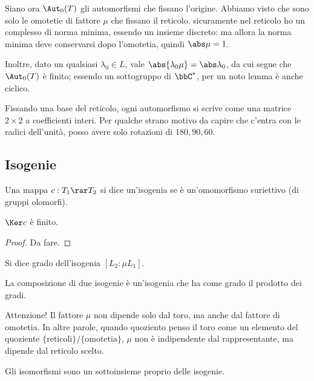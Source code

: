 	Siano ora $\Aut_0(T)$ gli automorfismi che fissano l'origine. Abbiamo visto che sono solo le omotetie di fattore $\mu$ che fissano il reticolo. sicuramente nel reticolo ho un complesso di norma minima, essendo un insieme discreto: ma allora la norma minima deve conservarsi dopo l'omotetia, quindi $\abs \mu=1$.
	
	Inoltre, dato un qualsiasi $\lambda_0 \in L$, vale $\abs{\lambda_0 \mu} = \abs \lambda_0$, da cui segue che $\Aut_0(T)$ è finito; essendo un sottogruppo di $\bbC^*$, per un noto lemma è anche ciclico.
	
	Fissando una base del reticolo, ogni automorfismo si scrive come una matrice $2 \times 2$ a coefficienti interi. Per qualche strano motivo da capire che c'entra con le radici dell'unità, %
	posso avere solo rotazioni di $180, 90, 60$.
	
	\subsection{Isogenie}
	
	\begin{definizione}
		Una mappa $c: T_1 \rar T_2$ si dice un'isogenia se è un'omomorfismo suriettivo (di gruppi olomorfi).

	\end{definizione}
	
	\begin{proposizione}
		$\Ker c$ è finito.
	\end{proposizione}
	\begin{proof}
		Da fare.
	\end{proof}
	
	\begin{definizione}
		Si dice grado dell'isogenia $[L_2 : \mu L_1]$.
	\end{definizione}
	
	\begin{osservazione}
		La composizione di due isogenie è un'isogenia che ha come grado il prodotto dei gradi.
	\end{osservazione}
	
	Attenzione! Il fattore $\mu$ non dipende solo dal toro, ma anche dal fattore di omotetia. In altre parole, quando quoziento penso il toro come un elemento del quoziente $\{ \mbox{reticoli} \} / \{ \mbox{omotetia} \}$, $\mu$ non è indipendente dal rappresentante, ma dipende dal reticolo scelto.
	
	\begin{osservazione} 
		Gli isomorfismi sono un sottoinsieme proprio delle isogenie.
	\end{osservazione}




	
	


	
	

